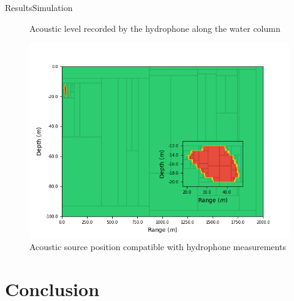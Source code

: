 \documentclass[9pt, xcolor={usenames, dvipsnames}]{beamer}
\begin{document}
\begin{frame}{Results}{Simulation}
\begin{minipage}[c]{0.48\textwidth}
\begin{overprint}
\begin{figure}
									\caption{Acoustic level recorded by the hydrophone along the water column}
								\end{figure}
								\begin{figure}
									\includegraphics[width=\textwidth]{images/localisation/Localisation.png}
									\caption{Acoustic source position compatible with hydrophone measurements}
								\end{figure}
						\end{overprint}
					\end{minipage}
				\end{frame}
				
		\section{Conclusion}
				
\end{document}
